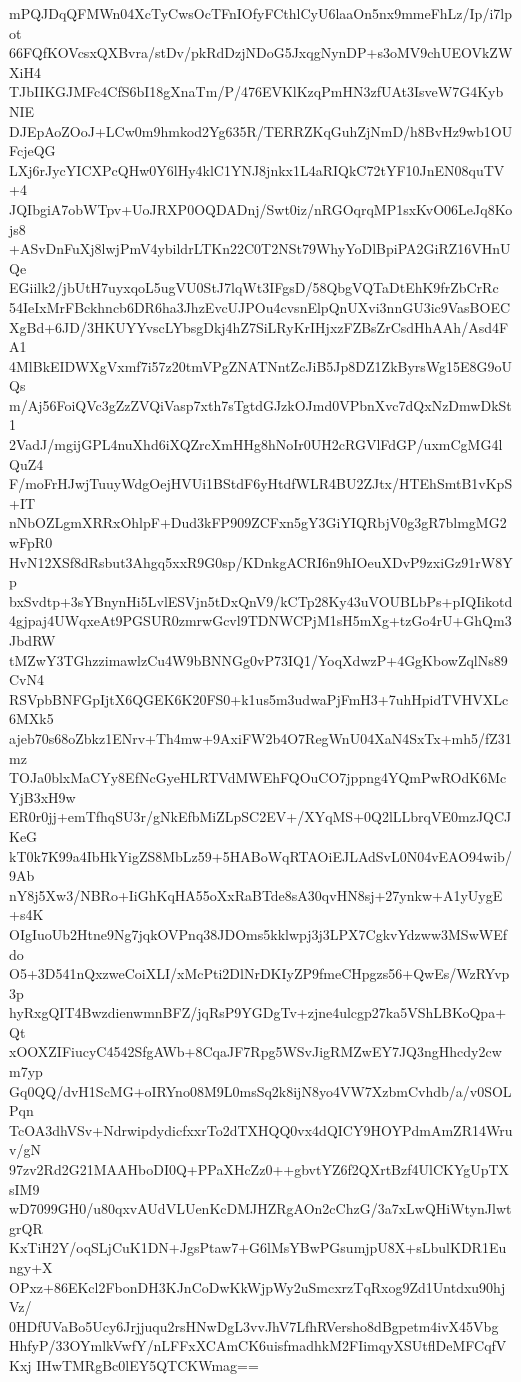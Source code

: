 mPQJDqQFMWn04XcTyCwsOcTFnIOfyFCthlCyU6laaOn5nx9mmeFhLz/Ip/i7lpot
66FQfKOVcsxQXBvra/stDv/pkRdDzjNDoG5JxqgNynDP+s3oMV9chUEOVkZWXiH4
TJbIIKGJMFc4CfS6bI18gXnaTm/P/476EVKlKzqPmHN3zfUAt3IsveW7G4KybNIE
DJEpAoZOoJ+LCw0m9hmkod2Yg635R/TERRZKqGuhZjNmD/h8BvHz9wb1OUFcjeQG
LXj6rJycYICXPcQHw0Y6lHy4klC1YNJ8jnkx1L4aRIQkC72tYF10JnEN08quTV+4
JQIbgiA7obWTpv+UoJRXP0OQDADnj/Swt0iz/nRGOqrqMP1sxKvO06LeJq8Kojs8
+ASvDnFuXj8lwjPmV4ybildrLTKn22C0T2NSt79WhyYoDlBpiPA2GiRZ16VHnUQe
EGiilk2/jbUtH7uyxqoL5ugVU0StJ7lqWt3IFgsD/58QbgVQTaDtEhK9frZbCrRc
54IeIxMrFBckhncb6DR6ha3JhzEvcUJPOu4cvsnElpQnUXvi3nnGU3ic9VasBOEC
XgBd+6JD/3HKUYYvscLYbsgDkj4hZ7SiLRyKrIHjxzFZBsZrCsdHhAAh/Asd4FA1
4MlBkEIDWXgVxmf7i57z20tmVPgZNATNntZcJiB5Jp8DZ1ZkByrsWg15E8G9oUQs
m/Aj56FoiQVc3gZzZVQiVasp7xth7sTgtdGJzkOJmd0VPbnXvc7dQxNzDmwDkSt1
2VadJ/mgijGPL4nuXhd6iXQZrcXmHHg8hNoIr0UH2cRGVlFdGP/uxmCgMG4lQuZ4
F/moFrHJwjTuuyWdgOejHVUi1BStdF6yHtdfWLR4BU2ZJtx/HTEhSmtB1vKpS+IT
nNbOZLgmXRRxOhlpF+Dud3kFP909ZCFxn5gY3GiYIQRbjV0g3gR7blmgMG2wFpR0
HvN12XSf8dRsbut3Ahgq5xxR9G0sp/KDnkgACRI6n9hIOeuXDvP9zxiGz91rW8Yp
bxSvdtp+3sYBnynHi5LvlESVjn5tDxQnV9/kCTp28Ky43uVOUBLbPs+pIQIikotd
4gjpaj4UWqxeAt9PGSUR0zmrwGcvl9TDNWCPjM1sH5mXg+tzGo4rU+GhQm3JbdRW
tMZwY3TGhzzimawlzCu4W9bBNNGg0vP73IQ1/YoqXdwzP+4GgKbowZqlNs89CvN4
RSVpbBNFGpIjtX6QGEK6K20FS0+k1us5m3udwaPjFmH3+7uhHpidTVHVXLc6MXk5
ajeb70s68oZbkz1ENrv+Th4mw+9AxiFW2b4O7RegWnU04XaN4SxTx+mh5/fZ31mz
TOJa0blxMaCYy8EfNcGyeHLRTVdMWEhFQOuCO7jppng4YQmPwROdK6McYjB3xH9w
ER0r0jj+emTfhqSU3r/gNkEfbMiZLpSC2EV+/XYqMS+0Q2lLLbrqVE0mzJQCJKeG
kT0k7K99a4IbHkYigZS8MbLz59+5HABoWqRTAOiEJLAdSvL0N04vEAO94wib/9Ab
nY8j5Xw3/NBRo+IiGhKqHA55oXxRaBTde8sA30qvHN8sj+27ynkw+A1yUygE+s4K
OIgIuoUb2Htne9Ng7jqkOVPnq38JDOms5kklwpj3j3LPX7CgkvYdzww3MSwWEfdo
O5+3D541nQxzweCoiXLI/xMcPti2DlNrDKIyZP9fmeCHpgzs56+QwEs/WzRYvp3p
hyRxgQIT4BwzdienwmnBFZ/jqRsP9YGDgTv+zjne4ulcgp27ka5VShLBKoQpa+Qt
xOOXZIFiucyC4542SfgAWb+8CqaJF7Rpg5WSvJigRMZwEY7JQ3ngHhcdy2cwm7yp
Gq0QQ/dvH1ScMG+oIRYno08M9L0msSq2k8ijN8yo4VW7XzbmCvhdb/a/v0SOLPqn
TcOA3dhVSv+NdrwipdydicfxxrTo2dTXHQQ0vx4dQICY9HOYPdmAmZR14Wruv/gN
97zv2Rd2G21MAAHboDI0Q+PPaXHcZz0++gbvtYZ6f2QXrtBzf4UlCKYgUpTXsIM9
wD7099GH0/u80qxvAUdVLUenKcDMJHZRgAOn2cChzG/3a7xLwQHiWtynJlwtgrQR
KxTiH2Y/oqSLjCuK1DN+JgsPtaw7+G6lMsYBwPGsumjpU8X+sLbulKDR1Eungy+X
OPxz+86EKcl2FbonDH3KJnCoDwKkWjpWy2uSmcxrzTqRxog9Zd1Untdxu90hjVz/
0HDfUVaBo5Ucy6Jrjjuqu2rsHNwDgL3vvJhV7LfhRVersho8dBgpetm4ivX45Vbg
HhfyP/33OYmlkVwfY/nLFFxXCAmCK6uisfmadhkM2FIimqyXSUtflDeMFCqfVKxj
IHwTMRgBc0lEY5QTCKWmag==
